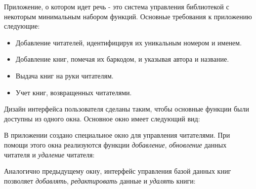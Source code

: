 \documentclass[a4paper,openany,twoside,final]{book}
\begin{document}
Приложение, о котором идет речь - это система управления библиотекой с
некоторым минимальным набором функций.  Основные требования к
приложению следующие:

\begin{itemize}

\item Добавление читателей, идентифицируя их уникальным номером и именем.

\item Добавление книг, помечая их баркодом, и указывая автора и название.

\item Выдача книг на руки читателям.

\item Учет книг, возвращенных читателями.

\end{itemize}

Дизайн интерфейса пользователя сделаны таким, чтобы основные функции
были доступны из одного окна.  Основное окно имеет следующий вид:

\noindent{}

В приложении создано специальное окно для управления читателями.  При
помощи этого окна реализуются функции \emph{добавление}, \emph{обновление}
данных читателя и \emph{удаление} читателя:

\noindent{}

Аналогично предыдущему окну, интерфейс управления базой данных книг
позволяет \emph{добавлять}, \emph{редактировать} данные и \emph{удалять} книги:
\end{document}
